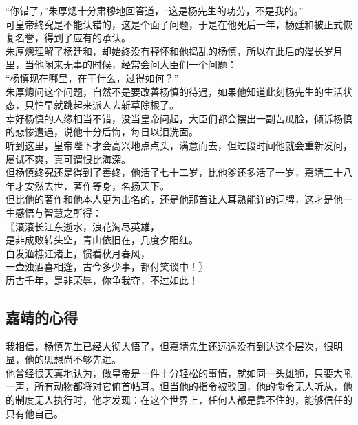 \begin{multicols}{\theparacolNo}
“你错了，”朱厚熜十分肃穆地回答道，“这是杨先生的功劳，不是我的。”\\

可皇帝终究是不能认错的，这是个面子问题，于是在他死后一年，杨廷和被正式恢复名誉，得到了应有的承认。\\

朱厚熜理解了杨廷和，却始终没有释怀和他捣乱的杨慎，所以在此后的漫长岁月里，当他闲来无事的时候，经常会问大臣们一个问题：\\

“杨慎现在哪里，在干什么，过得如何？”\\

朱厚熜问这个问题，自然不是要改善杨慎的待遇，如果他知道此刻杨先生的生活状态，只怕早就跳起来派人去斩草除根了。\\

幸好杨慎的人缘相当不错，没当皇帝问起，大臣们都会摆出一副苦瓜脸，倾诉杨慎的悲惨遭遇，说他十分后悔，每日以泪洗面。\\

听到这里，皇帝陛下才会高兴地点点头，满意而去，但过段时间他就会重新发问，屡试不爽，真可谓恨比海深。\\

但杨慎终究还是得到了善终，他活了七十二岁，比他爹还多活了一岁，嘉靖三十八年才安然去世，著作等身，名扬天下。\\

但比他的著作和他本人更为出名的，还是他那首让人耳熟能详的词牌，这才是他一生感悟与智慧之所得：\\

〖滚滚长江东逝水，浪花淘尽英雄，\\

是非成败转头空，青山依旧在，几度夕阳红。\\

白发渔樵江渚上，惯看秋月春风，\\

一壶浊酒喜相逢，古今多少事，都付笑谈中！〗\\

历古千年，是非荣辱，你争我夺，不过如此！\\

\subsection{嘉靖的心得}
我相信，杨慎先生已经大彻大悟了，但嘉靖先生还远远没有到达这个层次，很明显，他的思想尚不够先进。\\

他曾经很天真地认为，做皇帝是一件十分轻松的事情，就如同一头雄狮，只要大吼一声，所有动物都将对它俯首帖耳。但当他的指令被驳回，他的命令无人听从，他的制度无人执行时，他才发现：在这个世界上，任何人都是靠不住的，能够信任的只有他自己。\\


\end{multicols}
